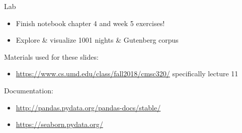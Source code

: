 \documentclass[aspectratio=169,usenames,dvipsnames]{beamer}
\begin{document}

\begin{frame}{Lab}
\begin{itemize}
    \item Finish notebook chapter 4 and week 5 exercises!
    \item Explore \& visualize 1001 nights \& Gutenberg corpus
\end{itemize}
\end{frame}

\begin{frame}
Materials used for these slides:
\begin{itemize}
\item \url{https://www.cs.umd.edu/class/fall2018/cmsc320/}
    specifically lecture 11
\end{itemize}

\vspace{1em}
Documentation:
\begin{itemize}
    \item \url{http://pandas.pydata.org/pandas-docs/stable/}
    \item \url{https://seaborn.pydata.org/}
\end{itemize}
\end{frame}
\end{document}
